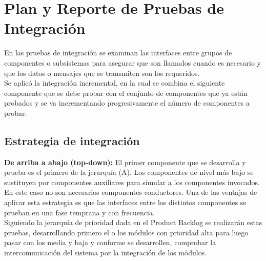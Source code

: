 \section{Plan y Reporte de Pruebas de Integración}
En las pruebas de integración se examinan las interfaces entre grupos de componentes o subsistemas para asegurar que son llamados cuando es necesario y que los datos o mensajes que se transmiten son los requeridos. \\

Se aplicó la integración incremental, en la cual se combina el siguiente componente que se debe probar con el conjunto de componentes que ya están probados y se va incrementando progresivamente el número de componentes a probar.
\subsection{Estrategia de integración}
\textbf{De arriba a abajo (top-down): } El primer componente que se desarrolla y prueba es el primero de la jerarquía (A). Los componentes de nivel más bajo se sustituyen por componentes auxiliares para simular a los componentes invocados. En este caso no son necesarios componentes conductores. Una de las ventajas de aplicar esta estrategia es que las interfaces entre los distintos componentes se prueban en una fase temprana y con frecuencia. \\
Siguiendo la jerarquía de prioridad dada en el Product Backlog se realizarán estas pruebas, desarrollando primero el o los módulos con prioridad alta para luego pasar con los media y baja y conforme se desarrollen, comprobar la intercomunicación del sistema por la integración de los módulos.
